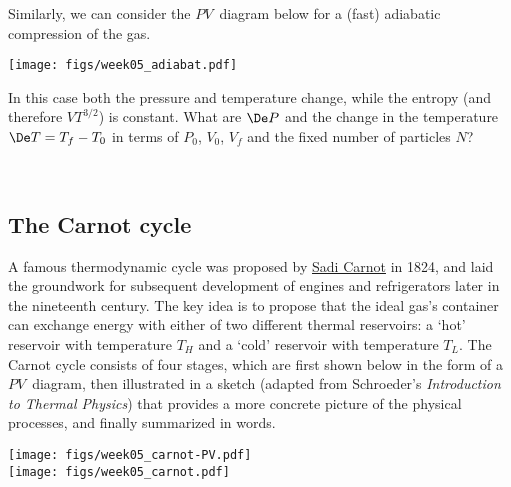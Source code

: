 Similarly, we can consider the $PV$~diagram below for a (fast) adiabatic compression of the gas.
\begin{center}
  \texttt{[image: figs/week05\_adiabat.pdf]}
\end{center}
In this case both the pressure and temperature change, while the entropy (and therefore $VT^{3 / 2}$) is constant.
What are $\De P$ and the change in the temperature $\De T = T_f - T_0$ in terms of $P_0$, $V_0$, $V_f$ and the fixed number of particles $N$?
\begin{mdframed}
  \ \\[120 pt]
\end{mdframed}



\subsection{The Carnot cycle}
A famous thermodynamic cycle was proposed by \href{https://en.wikipedia.org/wiki/Nicolas_Léonard_Sadi_Carnot}{Sadi Carnot} in 1824, and laid the groundwork for subsequent development of engines and refrigerators later in the nineteenth century.
The key idea is to propose that the ideal gas's container can exchange energy with either of two different thermal reservoirs: a `hot' reservoir with temperature $T_H$ and a `cold' reservoir with temperature $T_L$.
The Carnot cycle consists of four stages, which are first shown below in the form of a $PV$~diagram, then illustrated in a sketch (adapted from Schroeder's \textit{Introduction to Thermal Physics}) that provides a more concrete picture of the physical processes, and finally summarized in words.

\begin{center}
  \texttt{[image: figs/week05\_carnot-PV.pdf]} \\[36 pt]
  \texttt{[image: figs/week05\_carnot.pdf]}
\end{center}

